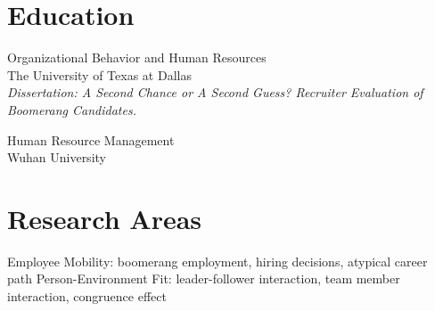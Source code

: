 
\raggedright

\begin{center}\namefont{\myname}\end{center}

\ifcvextended
  \vspace{1em}
\else\ifcvmedium
  \vspace{0.6em}
\else
  \vspace{0.35em}
\fi\fi
{}


\section*{Education}

\begin{entries}
    Organizational Behavior and Human Resources\\The University of Texas at Dallas\\
    \textit{Dissertation: A Second Chance or A Second Guess? Recruiter Evaluation of Boomerang Candidates.}

    Human Resource Management\\Wuhan University
\end{entries}


\section*{Research Areas}

\begin{entries}
    \entn{}Employee Mobility: boomerang employment, hiring decisions, atypical career path
    \entn{}Person-Environment Fit: leader-follower interaction, team member interaction, congruence effect
\end{entries}


